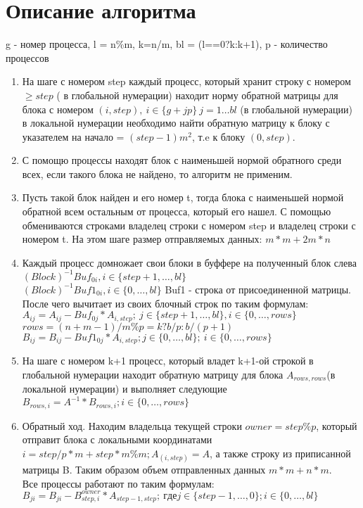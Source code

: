 \documentclass[12pt, a4paper]{article}
\begin{document}
\section {Описание алгоритма}
g - номер процесса, l = n\%m, k=n/m, bl = (l==0?k:k+1), p - количество процессов
\begin{enumerate}
    \item На шаге с номером step каждый процесс, который хранит строку с номером $\geq step$ ( в глобальной нумерации) находит норму обратной матрицы для блока с номером $(i, step),\ i\in \{g+jp\}\ j =1\dots bl$ (в глобальной нумерации) в локальной нумерации необходимо найти обратную матрицу к блоку с указателем на начало = $(step-1)m^2$, т.e к блоку $(0, step)$.
    \item С помощю  процессы находят блок с наименьшей нормой обратного среди всех, если такого блока не найдено, то алгоритм не применим.
    \item Пусть такой блок найден и его номер t, тогда  блока с наименьшей нормой обратной всем остальным от процесса, который его нашел. С помощью  обмениваются строками владелец строки с номером step и владелец строки с номером t. На этом шаге размер отправляемых данных: $m*m + 2m*n$
    \item Каждый процесс домножает свои блоки в буффере на полученный блок слева\\
    $(Block)^{-1}  Buf_{0i}, i\in \{step+1,\ldots, bl\} $\\
    $(Block)^{-1}  Buf1_{0i}, i\in \{0,\ldots, bl\}$ Buf1 - строка от присоединенной матрицы.\\ После чего вычитает из своих блочный строк по таким формулам: \\
    $A_{ij} = A_{ij} - Buf_{0j}*A_{i,step};\ j \in \{step+1,\dots, bl\} , i\in \{0,\dots, rows\}$\\
    $ rows = (n+m-1)/m\%p=k?b/p:b/(p+1)$\\
    $B_{ij} = B_{ij}-Buf1_{0j}*A_{i,step}; j\in \{0,\dots , bl\};\ i\in \{0,\dots, rows\}$
    \item На шаге с номером k+1 процесс, который владет k+1-ой строкой в глобальной нумерации находит обратную матрицу для блока $A_{rows, rows}$(в локальной нумерации) и выполняет следующие \\
    $B_{rows, i} = A^{-1}*B_{rows, i}; i\in \{0, \dots , rows\} $
    \item Обратный ход. Находим владельца текущей строки $owner = step\%p$, который отправит  блока 
    с локальными координатами $i=step/p*m + step*m\%m;A_{(i, step)}=A$, а также строку из приписанной матрицы B. Таким образом объем отправленных данных $m*m+n*m$.\\
    Все процессы работают по таким формулам: \\
    $B_{ji} = B_{ji} - B^{owner}_{step,i}*A_{step-1, step};\ где j\in \{step-1,\dots, 0\}; i\in \{0,\dots,bl\}$
\end{enumerate}
\end{document}
